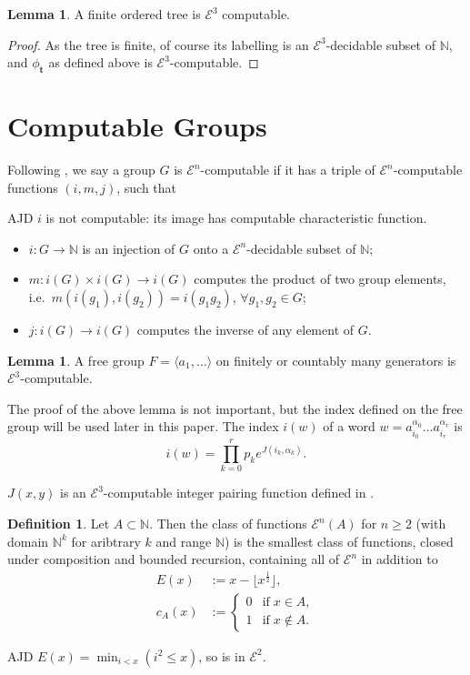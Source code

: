 \documentclass[a4paper]{article}
\newcommand{\grz}[1]{$\mathcal{E}^{#1}$}	%
\newcommand{\NN}{\mathbb{N}}	%
\newcommand{\tvec}{\mathbf{t}}	%
\theoremstyle{plain}
\theoremstyle{definition}
\newtheorem{lemma}[theorem]{Lemma}
\newtheorem{definition}[theorem]{Definition}
\newenvironment{ad}{\noindent\color{green} AJD }{}
\newcommand{\ajd}[1]{
\begin{ad} #1 \end{ad}}
\begin{document}
\begin{lemma}
A finite ordered tree is \grz{3} computable.
\end{lemma}

\begin{proof}
As the tree is finite, of course its labelling is an \grz{3}-decidable subset of $\NN$, and $\phi_{\tvec}$ as defined above is \grz{3}-computable.
\end{proof}

\section{Computable Groups \label{groups}}

Following \cite{Cannonito_1966}, we say a group $G$ is \grz{n}-computable if it has a triple of \grz{n}-computable functions $(i,m,j)$, such that

\ajd{$i$ is not computable: its image has computable characteristic function.}
\begin{itemize}
	\item $i: G \rightarrow \NN$ is an injection of $G$ onto a \grz{n}-decidable subset of $\NN$;
	\item $m: i(G) \times i(G) \rightarrow i(G)$ computes the product of two group elements, i.e.\ $m \left(i(g_1),i(g_2)\right) = i(g_1g_2)$, $\forall g_1,g_2 \in G$;
	\item $j: i(G) \rightarrow i(G)$ computes the inverse of any element of $G$.
\end{itemize}

\begin{lemma}\cite[3.1]{Cannonito_1973}
	A free group $F = \langle a_1, \dots \rangle$ on finitely or countably many generators is \grz{3}-computable.
\end{lemma}

The proof of the above lemma is not important, but the index defined on the free group will be used later in this paper. The index $i(w)$ of a word $w = a_{i_0}^{\alpha_0} \dots a_{i_r}^{\alpha_r}$ is
\[ i(w) = \prod_{k=0}^r p_k e^{J(i_k,\alpha_k)}. \]

$J(x,y)$ is an \grz{3}-computable integer pairing function defined in \cite{Cannonito_1973}.


\begin{definition} \cite[2.3]{Cannonito_1973}
	Let $A \subset \NN$. Then the class of functions \grz{n}$(A)$ for $n \geq 2$ (with domain $\NN^k$ for aribtrary $k$ and range $\NN$) is the smallest class of functions, closed under composition and bounded recursion, containing all of \grz{n} in addition to 
	\begin{align}
		E(x) &:= x - \lfloor x^{\frac{1}{2}} \rfloor, \\
		c_A(x) &:= \begin{cases}
									0 & \textrm{if}\; x \in A, \\
									1 & \textrm{if}\;  x \notin A.
							\end{cases}
	\end{align}
\end{definition}
\ajd{$E(x)=\min_{i<x}(i^2\le x)$, so is in \grz{2}.}
 
\end{document}
